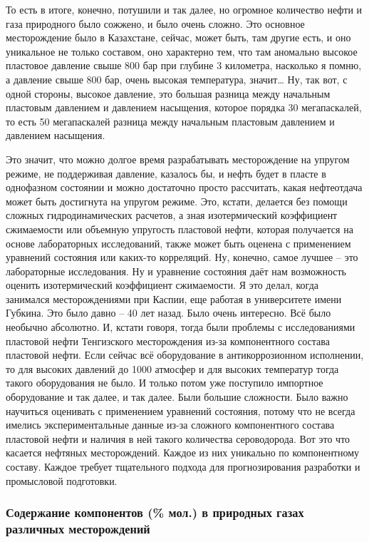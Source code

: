 \documentclass[main.tex]{subfiles}
\begin{document}
То есть в итоге, конечно, потушили и так далее, но огромное количество нефти и газа природного было сожжено, и было очень сложно.
Это основное месторождение было в Казахстане, сейчас, может быть, там другие есть, и оно уникальное не только составом, оно характерно тем, что там аномально высокое пластовое давление свыше 800 бар при глубине 3 километра, насколько я помню, а давление свыше 800 бар, очень высокая температура, значит…
Ну, так вот, с одной стороны, высокое давление, это большая разница между начальным пластовым давлением и давлением насыщения, которое порядка 30 мегапаскалей, то есть 50 мегапаскалей разница между начальным пластовым давлением и давлением насыщения.

Это значит, что можно долгое время разрабатывать месторождение на упругом режиме, не поддерживая давление, казалось бы, и нефть будет в пласте в однофазном состоянии и можно достаточно просто рассчитать, какая нефтеотдача может быть достигнута на упругом режиме.
Это, кстати, делается без помощи сложных гидродинамических расчетов, а зная изотермический коэффициент сжимаемости или объемную упругость пластовой нефти, которая получается на основе лабораторных исследований, также может быть оценена с применением уравнений состояния или каких-то корреляций.
Ну, конечно, самое лучшее -- это лабораторные исследования.
Ну и уравнение состояния даёт нам возможность оценить изотермический коэффициент сжимаемости.
Я это делал, когда занимался месторождениями при Каспии, еще работая в университете имени Губкина.
Это было давно -- 40 лет назад.
Было очень интересно.
Всё было необычно абсолютно.
И, кстати говоря, тогда были проблемы с исследованиями пластовой нефти Тенгизского месторождения из-за компонентного состава пластовой нефти.
Если сейчас всё оборудование в антикоррозионном исполнении, то для высоких давлений до 1000 атмосфер и для высоких температур тогда такого оборудования не было.
И только потом уже поступило импортное оборудование и так далее, и так далее.
Были большие сложности.
Было важно научиться оценивать с применением уравнений состояния, потому что не всегда имелись экспериментальные данные из-за сложного компонентного состава пластовой нефти и наличия в ней такого количества сероводорода.
Вот это что касается нефтяных месторождений.
Каждое из них уникально по компонентному составу.
Каждое требует тщательного подхода для прогнозирования разработки и промысловой подготовки.

\subsubsection{Содержание компонентов (\% мол.) в природных газах различных месторождений}
\end{document}
